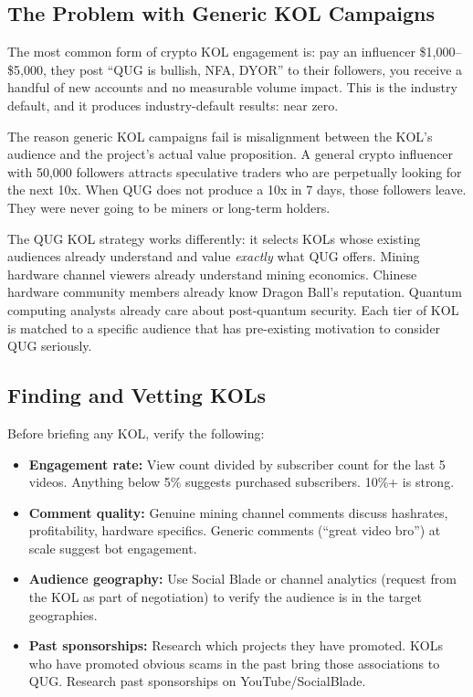 \documentclass[11pt,a4paper]{article}
\begin{document}
\subsection{The Problem with Generic KOL Campaigns}

The most common form of crypto KOL engagement is: pay an influencer \$1,000--\$5,000, they post ``QUG is bullish, NFA, DYOR'' to their followers, you receive a handful of new accounts and no measurable volume impact. This is the industry default, and it produces industry-default results: near zero.

The reason generic KOL campaigns fail is misalignment between the KOL's audience and the project's actual value proposition. A general crypto influencer with 50,000 followers attracts speculative traders who are perpetually looking for the next 10x. When QUG does not produce a 10x in 7 days, those followers leave. They were never going to be miners or long-term holders.

The QUG KOL strategy works differently: it selects KOLs whose existing audiences already understand and value \emph{exactly} what QUG offers. Mining hardware channel viewers already understand mining economics. Chinese hardware community members already know Dragon Ball's reputation. Quantum computing analysts already care about post-quantum security. Each tier of KOL is matched to a specific audience that has pre-existing motivation to consider QUG seriously.

\subsection{Finding and Vetting KOLs}

Before briefing any KOL, verify the following:

\begin{itemize}[leftmargin=1.5em, itemsep=2pt]
  \item \textbf{Engagement rate:} View count divided by subscriber count for the last 5 videos. Anything below 5\% suggests purchased subscribers. 10\%+ is strong.
  \item \textbf{Comment quality:} Genuine mining channel comments discuss hashrates, profitability, hardware specifics. Generic comments (``great video bro'') at scale suggest bot engagement.
  \item \textbf{Audience geography:} Use Social Blade or channel analytics (request from the KOL as part of negotiation) to verify the audience is in the target geographies.
  \item \textbf{Past sponsorships:} Research which projects they have promoted. KOLs who have promoted obvious scams in the past bring those associations to QUG. Research past sponsorships on YouTube/SocialBlade.
\end{itemize}
\end{document}
